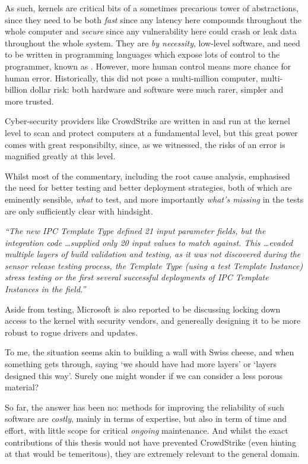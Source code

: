 As such, kernels are critical bits of a sometimes precarious tower of
abstractions, since they need to be both \emph{fast} \textemdash{} since any
latency here compounds throughout the whole computer \textemdash{} and
\emph{secure} \textemdash{} since any vulnerability here could crash or leak
data throughout the whole system. They are \emph{by necessity}, low-level
software, and need to be written in programming languages which expose lots of
control to the programmer, known as .
However, more human control means more chance for human error. Historically,
this did not pose a multi-million computer, multi-billion dollar risk: both
hardware and software were much rarer, simpler and more trusted.

Cyber-security providers like CrowdStrike are written in  and run at the kernel level to scan and
protect computers at a fundamental level, but this great power comes with great
responsibilty, since, as we witnessed, the risks of an error is magnified
greatly at this level.

Whilst most of the commentary, including the root cause
analysis, emphasised the need for better testing
and better deployment strategies, both of which are eminently sensible,
\emph{what} to test, and more importantly \emph{what's missing} in the tests
are only sufficiently clear with hindsight.

\emph{%
``The new IPC Template Type defined 21 input parameter fields, but the
integration code \ldots supplied only 20 input values to match against. This
\ldots evaded multiple layers of build validation and testing, as it was not
discovered during the sensor release testing process, the Template Type (using
a test Template Instance) stress testing or the first several successful
deployments of IPC Template Instances in the field.''
}

Aside from testing, Microsoft is also reported to be discussing locking down
access to the kernel with security vendors, and genereally designing it to be
more robust to rogue drivers and updates.

To me, the situation seems akin to building a wall with Swiss cheese, and when
something gets through, saying `we should have had more layers' or `layers
designed this way'. Surely one might wonder if we can consider a less porous
material?

So far, the answer has been no: methods for improving the reliability of such
software are \emph{costly}, mainly in terms of expertise, but also in term of
time and effort, with little scope for critical \emph{ongoing} maintenance. And
whilst the exact contributions of this thesis would not have prevented
CrowdStrike (even hinting at that would be temeritous), they are extremely
relevant to the general domain.

